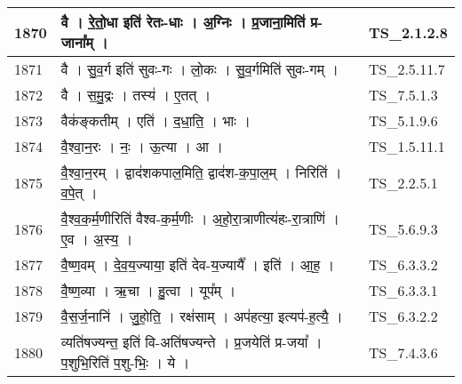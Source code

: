 \documentclass[17pt]{extarticle}
\begin{document}
\begin{longtable}{||p{0.4in}||p{4.9in}||p{0.9in}||}
    1870 & वै   ।   रे॒तो॒धा इति॑ रेतः{-}धाः   ।   अ॒ग्निः   ।   प्र॒जाना॒मिति॑ प्र{-}जाना᳚म्   ।    & TS\_2.1.2.8       \\
    
    \hline
        
    1871 & वै   ।   सु॒व॒र्ग इति॑ सुवः{-}गः   ।   लो॒कः   ।   सु॒व॒र्गमिति॑ सुवः{-}गम्   ।    & TS\_2.5.11.7       \\
    
    \hline
        
    1872 & वै   ।   स॒मु॒द्रः   ।   तस्य॑   ।   ए॒तत्   ।    & TS\_7.5.1.3       \\
    
    \hline
        
    1873 & वैक॑ङ्कतीम्   ।   एति॑   ।   द॒धा॒ति॒   ।   भाः   ।    & TS\_5.1.9.6       \\
    
    \hline
        
    1874 & वै॒श्वा॒न॒रः   ।   नः॒   ।   ऊ॒त्या   ।   आ   ।    & TS\_1.5.11.1       \\
    
    \hline
        
    1875 & वै॒श्वा॒न॒रम्   ।   द्वाद॑शकपाल॒मिति॒ द्वाद॑श{-}क॒पा॒ल॒म्   ।   निरिति॑   ।   व॒पे॒त्   ।    & TS\_2.2.5.1       \\
    
    \hline
        
    1876 & वै॒श्व॒क॒र्म॒णीरिति॑ वैश्व{-}क॒र्म॒णीः   ।   अ॒हो॒रा॒त्राणीत्य॑हः{-}रा॒त्राणि॑   ।   ए॒व   ।   अ॒स्य॒   ।    & TS\_5.6.9.3       \\
    
    \hline
        
    1877 & वै॒ष्ण॒वम्   ।   दे॒व॒य॒ज्याया॒ इति॑ देव{-}य॒ज्यायै᳚   ।   इति॑   ।   आ॒ह॒   ।    & TS\_6.3.3.2       \\
    
    \hline
        
    1878 & वै॒ष्ण॒व्या   ।   ऋ॒चा   ।   हु॒त्वा   ।   यूप᳚म्   ।    & TS\_6.3.3.1       \\
    
    \hline
        
    1879 & वै॒स॒र्ज॒नानि॑   ।   जु॒हो॒ति॒   ।   रक्ष॑साम्   ।   अप॑हत्या॒ इत्यप॑{-}ह॒त्यै॒   ।    & TS\_6.3.2.2       \\
    
    \hline
        
    1880 & व्यति॑षज्यन्त॒ इति॑ वि{-}अति॑षज्यन्ते   ।   प्र॒जयेति॑ प्र{-}जया᳚   ।   प॒शुभि॒रिति॑ प॒शु{-}भिः॒   ।   ये   ।    & TS\_7.4.3.6       \\
    

\end{longtable}
\end{document}

